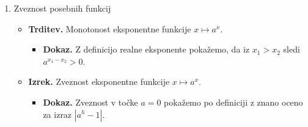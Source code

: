 \begin{enumerate}
    \item Zveznost posebnih funkcij
    \begin{itemize}
        \item \colorbox{blue!30}{\textbf{Trditev.}} Monotonost eksponentne funkcije $x \mapsto a^x$.
        \begin{itemize}
            \item \colorbox{green!30}{\textbf{Dokaz.}} Z definicijo realne eksponente pokažemo, da iz $x_1 > x_2$ sledi $a^{x_1 - x_2} > 0$.
        \end{itemize}
        \item \colorbox{blue!30}{\textbf{Izrek.}} Zveznost eksponentne funkcije $x \mapsto a^x$.
        \begin{itemize}
            \item \colorbox{green!30}{\textbf{Dokaz.}} Zveznost v točke $a=0$ pokažemo po definiciji z znano oceno za izraz $|a^h-1|$.
        

\end{itemize}
\end{itemize}
\end{enumerate}
